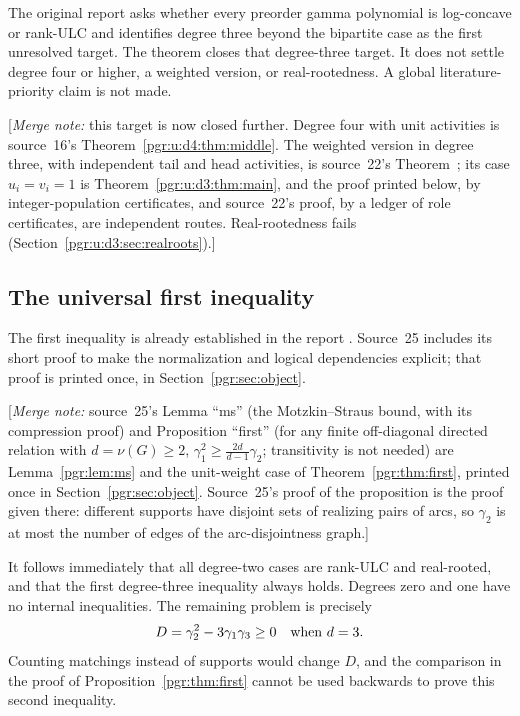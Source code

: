 \documentclass[11pt]{article}
\makeatletter
\numberwithin{equation}{section}
\theoremstyle{definition}\newtheorem{definition}[theorem]{Definition}\newtheorem{remark}[theorem]{Remark}
\newcommand{\mnote}[1]{[\textit{Merge note:} #1]}
\newcommand{\pgrfwd}[2]{\@ifundefined{r@#1}{#2}{\ref{#1}}}
\makeatother
\begin{document}
The original report \cite[Part XII, question \texttt{mr:q:gamma}]{PRP} asks whether every preorder gamma polynomial is log-concave or rank-ULC and identifies degree three beyond the bipartite case as the first unresolved target. The theorem closes that degree-three target. It does not settle degree four or higher, a weighted version, or real-rootedness. A global literature-priority claim is not made.

\mnote{this target is now closed further. Degree four with unit activities
is source~16's Theorem~\ref{pgr:u:d4:thm:middle}. The weighted version in
degree three, with independent tail and head activities, is source~22's
Theorem~\pgrfwd{pgr:r:ir:thm:main}{(source~22, Part~II)}; its case
$u_i=v_i=1$ is Theorem~\ref{pgr:u:d3:thm:main}, and the proof printed
below, by integer-population certificates, and source~22's proof, by a
ledger of role certificates, are independent routes. Real-rootedness fails
(Section~\ref{pgr:u:d3:sec:realroots}).}



\subsection{The universal first inequality}

The first inequality is already established in the report \cite[\texttt{mr:thm:first}]{PRP}. Source~25 includes its short proof to make the normalization and logical dependencies explicit; that proof is printed once, in Section~\ref{pgr:sec:object}.


\mnote{source~25's Lemma ``ms'' (the Motzkin--Straus bound, with its
compression proof) and Proposition ``first'' (for any finite off-diagonal
directed relation with $d=\nu(G)\ge2$, $\gamma_1^2\ge\frac{2d}{d-1}\gamma_2$;
transitivity is not needed) are Lemma~\ref{pgr:lem:ms} and the unit-weight
case of Theorem~\ref{pgr:thm:first}, printed once in
Section~\ref{pgr:sec:object}. Source~25's proof of the proposition is the
proof given there: different supports have disjoint sets of realizing
pairs of arcs, so $\gamma_2$ is at most the number of edges of the
arc-disjointness graph.}


It follows immediately that all degree-two cases are rank-ULC and real-rooted, and that the first degree-three inequality always holds. Degrees zero and one have no internal inequalities. The remaining problem is precisely
\begin{equation}\label{pgr:u:d3:eq:gapD}
 D=\gamma_2^2-3\gamma_1\gamma_3\ge0
 \quad\hbox{when }d=3.
\end{equation}
Counting matchings instead of supports would change $D$, and the comparison in the proof of Proposition~\ref{pgr:thm:first} cannot be used backwards to prove this second inequality.
\end{document}
